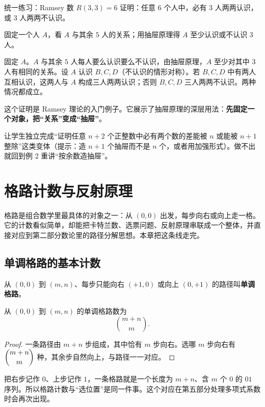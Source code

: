 \begin{problem}{统一练习：Ramsey 数 $R(3,3)=6$}
证明：任意 $6$ 个人中，必有 $3$ 人两两认识，或 $3$ 人两两不认识。
\end{problem}
\hint 固定一个人 $A$，看 $A$ 与其余 $5$ 人的关系；用抽屉原理得 $A$ 至少认识或不认识 $3$ 人。

\sol 固定 $A$。$A$ 与其余 $5$ 人每人要么认识要么不认识，由抽屉原理，$A$ 至少对其中 $3$ 人有相同的关系。设 $A$ 认识 $B,C,D$（不认识的情形对称）。若 $B,C,D$ 中有两人互相认识，这两人与 $A$ 构成三人两两认识；否则 $B,C,D$ 三人两两不认识。两种情况都成立。

这个证明是 Ramsey 理论的入门例子。它展示了抽屉原理的深层用法：\textbf{先固定一个对象，把“关系”变成“抽屉”}。

\begin{teach}[本章的离堂检查]
让学生独立完成“证明任意 $n+2$ 个正整数中必有两个数的差能被 $n$ 或能被 $n+1$ 整除”这类变体（提示：造 $n+1$ 个抽屉而不是 $n$ 个，或者用加强形式）。做不出就回到例 2 重讲“按余数造抽屉”。
\end{teach}

\chapter{格路计数与反射原理}
\begin{chapterintro}[章节导读]
格路是组合数学里最具体的对象之一：从 $(0,0)$ 出发，每步向右或向上走一格。它的计数看似简单，却能把卡特兰数、选票问题、反射原理串联成一个整体，并直接对应到第二部分数论里的路径分解思想。本章把这条线走完。
\end{chapterintro}

\section{单调格路的基本计数}
\begin{definition}[单调格路]
从 $(0,0)$ 到 $(m,n)$、每步只能向右 $(+1,0)$ 或向上 $(0,+1)$ 的路径叫\textbf{单调格路}。
\end{definition}
\begin{theorem}[单调格路计数]
从 $(0,0)$ 到 $(m,n)$ 的单调格路数为
\[
\binom{m+n}{m}.
\]
\end{theorem}
\begin{proof}
一条路径由 $m+n$ 步组成，其中恰有 $m$ 步向右。选哪 $m$ 步向右有 $\dbinom{m+n}{m}$ 种，其余步自然向上，与路径一一对应。
\end{proof}

\begin{tip}
把右步记作 $0$、上步记作 $1$，一条格路就是一个长度为 $m+n$、含 $m$ 个 $0$ 的 $01$ 序列。所以格路计数与“选位置”是同一件事。这个对应在第五部分处理多项式系数时会再次出现。
\end{tip}

